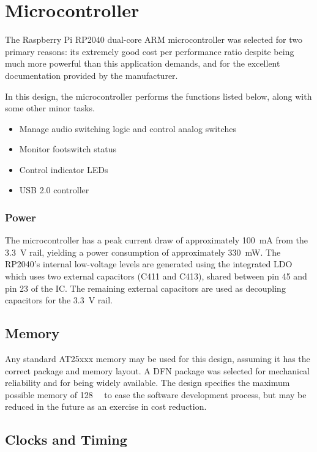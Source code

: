\documentclass[12pt, titlepage]{/home/air/projects/latex-template/tex-template}
\begin{document}
{{%

\section{Microcontroller}

The Raspberry Pi RP2040 dual-core ARM microcontroller was selected for two primary reasons: its extremely good cost per performance ratio despite being much more powerful than this application demands, and for the excellent documentation provided by the manufacturer.

In this design, the microcontroller performs the functions listed below, along with some other minor tasks.

\begin{itemize}
    \item Manage audio switching logic and control analog switches
    \item Monitor footswitch status
    \item Control indicator LEDs
    \item USB 2.0 controller
\end{itemize}

\subsubsection{Power}

The microcontroller has a peak current draw of approximately \SI{100}{\milli\ampere} from the \SI{3.3}{\volt} rail, yielding a power consumption of approximately \SI{330}{\milli\watt}. The RP2040's internal low-voltage levels are generated using the integrated LDO which uses two external capacitors (C411 and C413), shared between pin 45 and pin 23 of the IC. The remaining external capacitors are used as decoupling capacitors for the \SI{3.3}{\volt} rail.

\subsection{Memory}

Any standard AT25xxx memory may be used for this design, assuming it has the correct package and memory layout. A DFN package was selected for mechanical reliability and for being widely available. The design specifies the maximum possible memory of \SI{128}{\mega\bit} to ease the software development process, but may be reduced in the future as an exercise in cost reduction.

\subsection{Clocks and Timing}

}}
\end{document}
